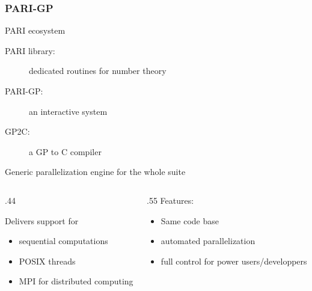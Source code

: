 \documentclass{beamer}
\begin{document}
\begin{frame}
  \frametitle{PARI-GP}

  \begin{block}
    {PARI ecosystem}

    \begin{description}
    \item[PARI library:] dedicated routines for number theory
    \item[PARI-GP:] an interactive system
    \item[GP2C:] a GP to C compiler
    \end{description}
  \end{block}
  \begin{block} {Generic parallelization engine for the whole suite}
    \begin{columns}
      \begin{column} {.44\textwidth}

    Delivers support for 
    \begin{itemize}
    \item sequential computations
    \item POSIX threads
    \item MPI for distributed computing
    \end{itemize}
      \end{column}
      \begin{column} {.55\textwidth}
        Features:
        \begin{itemize}
        \item Same code base
        \item automated parallelization
        \item full control for power users/developpers
        \end{itemize}
      \end{column}

    \end{columns}
  \end{block}
\end{frame}
\end{document}
